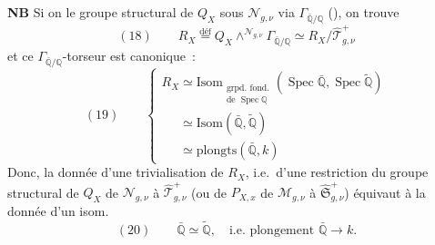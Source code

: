 \documentclass[11pt,a4paper]{article}
\begin{document}
\textbf{NB} Si on   le groupe structural de
$Q_X$ sous $\mathcal{N}_{g,\nu}$ via $\Gamma_{\bar{\mathbb{Q}}/\mathbb{Q}}$
(), on trouve
\[
  (18)\qquad R_X \overset{\mathrm{déf}}{=} Q_X \wedge^{\mathcal{N}_{g,\nu}} \Gamma_{\bar{\mathbb{Q}}/\mathbb{Q}}
  \simeq R_X/\hat{\mathcal{T}}^{+}_{g,\nu}
\]
et ce $\Gamma_{\bar{\mathbb{Q}}/\mathbb{Q}}$-torseur est canonique~:
\[
  (19)\qquad
  \begin{cases}
    R_X \simeq \mathrm{Isom}_{\substack{\text{grpd.\ fond.}\\ \text{de } \operatorname{Spec}\mathbb{Q}}}(\operatorname{Spec}\bar{\mathbb{Q}},\operatorname{Spec}\tilde{\mathbb{Q}})\\
    \phantom{R_X}\simeq \mathrm{Isom}(\bar{\mathbb{Q}},\tilde{\mathbb{Q}})\\
    \phantom{R_X}\simeq \mathrm{plongts}(\bar{\mathbb{Q}},k)
  \end{cases}
\]
Donc, la donnée d'une trivialisation de $R_X$, i.e.\ d'une restriction
du groupe structural de $Q_X$ de $\mathcal{N}_{g,\nu}$ à
$\hat{\mathcal{T}}^{+}_{g,\nu}$ (ou de $P_{X,x}$ de $\mathcal{M}_{g,\nu}$
à $\hat{\mathfrak{S}}^{+}_{g,\nu}$) équivaut à la donnée d'un isom.
\[
  (20)\qquad \bar{\mathbb{Q}}\simeq\tilde{\mathbb{Q}}, \quad\text{i.e.\ plongement } \bar{\mathbb{Q}}\to k.
\]
\end{document}
